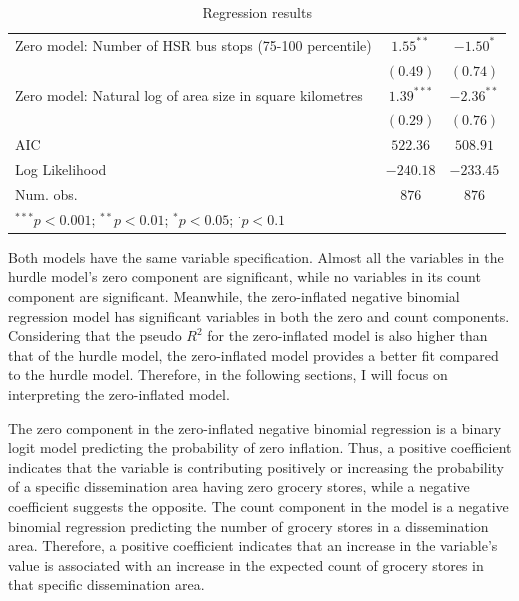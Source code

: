 \documentclass[preprint, 3p,
authoryear]{elsarticle} %
\begin{document}
\begin{table}
\begin{center}
\begin{footnotesize}
\begin{tabular}{l c c}
Zero model: Number of HSR bus stops (75-100 percentile)                       & $1.55^{**}$  & $-1.50^{*}$     \\
                                                                              & $(0.49)$     & $(0.74)$        \\
Zero model: Natural log of area size in square kilometres                     & $1.39^{***}$ & $-2.36^{**}$    \\
                                                                              & $(0.29)$     & $(0.76)$        \\
\hline
AIC                                                                           & $522.36$     & $508.91$        \\
Log Likelihood                                                                & $-240.18$    & $-233.45$       \\
Num. obs.                                                                     & $876$        & $876$           \\
\hline
\multicolumn{3}{l}{\tiny{$^{***}p<0.001$; $^{**}p<0.01$; $^{*}p<0.05$; $^{\cdot}p<0.1$}}
\end{tabular}
\end{footnotesize}
\caption{Regression results}
\label{tab:regression_results}
\end{center}
\end{table}

Both models have the same variable specification. Almost all the
variables in the hurdle model's zero component are significant, while no
variables in its count component are significant. Meanwhile, the
zero-inflated negative binomial regression model has significant
variables in both the zero and count components. Considering that the
pseudo \(R^2\) for the zero-inflated model is also higher than that of
the hurdle model, the zero-inflated model provides a better fit compared
to the hurdle model. Therefore, in the following sections, I will focus
on interpreting the zero-inflated model.

The zero component in the zero-inflated negative binomial regression is
a binary logit model predicting the probability of zero inflation. Thus,
a positive coefficient indicates that the variable is contributing
positively or increasing the probability of a specific dissemination
area having zero grocery stores, while a negative coefficient suggests
the opposite. The count component in the model is a negative binomial
regression predicting the number of grocery stores in a dissemination
area. Therefore, a positive coefficient indicates that an increase in
the variable's value is associated with an increase in the expected
count of grocery stores in that specific dissemination area.
\end{document}
